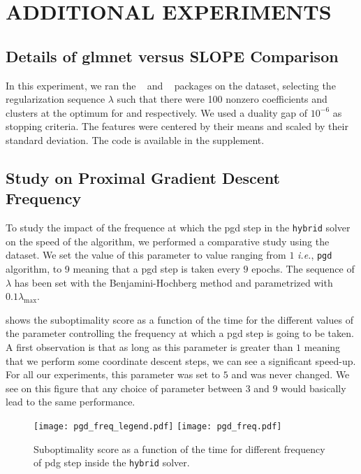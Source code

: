 \section{ADDITIONAL EXPERIMENTS}\label{sec:add_expes}

\subsection{Details of \textsf{glmnet} versus \textsf{SLOPE} Comparison}
\label{sec:slope-vs-glmnet}

In this experiment, we ran the ~\parencite{friedman2022} and ~\parencite{larsson2022d} packages on the  dataset, selecting the regularization sequence \(\lambda\) such that there were 100 nonzero coefficients and clusters at the optimum for  and  respectively.
We used a duality gap of \(10^{-6}\) as stopping criteria.
The features were centered by their means and scaled by their standard deviation.
The code is available in the supplement.

\subsection{Study on Proximal Gradient Descent Frequency}
To study the impact of the frequence at which the pgd step in the \texttt{hybrid} solver on the speed of the algorithm, we performed a comparative study using the  dataset. 
We set the value of this parameter to value ranging from $1$ \textit{i.e.}, \texttt{pgd} algorithm, to 9 meaning that a pgd step is taken every $9$ epochs. 
The sequence of $\lambda$ has been set with the Benjamini-Hochberg method and parametrized with $0.1 \lambda_{\text{max}}$. 

 shows the suboptimality score as a function of the time for the different values of the parameter controlling the frequency at which a pgd step is going to be taken. 
A first observation is that as long as this parameter is greater than $1$ meaning that we perform some coordinate descent steps, we can see a significant speed-up. 
For all our experiments, this parameter was set to $5$ and was never changed. 
We see on this figure that any choice of parameter between $3$ and $9$ would basically lead to the same performance. 

\begin{figure*}[htb]
  \centering
  \texttt{[image: pgd\_freq\_legend.pdf]}
  \texttt{[image: pgd\_freq.pdf]}
  \caption{Suboptimality score as a function of the time for different frequency of pdg step inside the \texttt{hybrid} solver.}
  \label{fig:pgd_freq}
\end{figure*}

